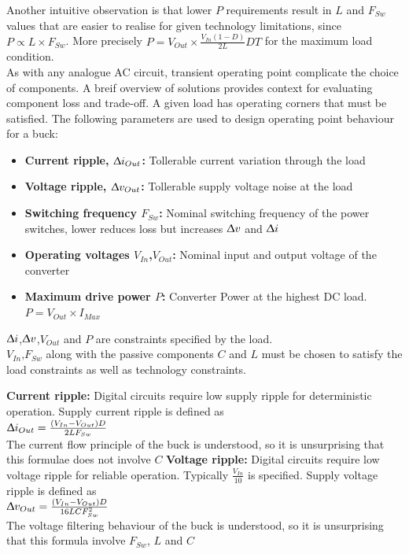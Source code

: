 \documentclass[letterpaper,twocolumn,10pt]{article}
\begin{document}
Another intuitive observation is that lower $P$ requirements result in $L$ and $F_{Sw}$ values that are easier to realise for given technology limitations, since $P \propto L\times F_{Sw}$. More precisely $P = V_{Out}\times \frac{V_{In}(1 - D)}{2L}DT$ for the maximum load condition.\\ %
\indent As with any analogue AC circuit, transient operating point complicate the choice of components. A breif overview of solutions provides context for evaluating component loss and trade-off. %
A given load has operating corners that must be satisfied. The following parameters are used to design operating point behaviour for a buck: %
\begin{itemize}
\item {\textbf{Current ripple, $\Updelta i_{Out}$: }Tollerable current variation through the load}
\item {\textbf{Voltage ripple, $\Updelta v_{Out}$: }Tollerable supply voltage noise at the load}
\item {\textbf{Switching frequency $F_{Sw}$: }Nominal switching frequency of the power switches, lower reduces loss but increases $\Updelta v$ and $\Updelta i$}
\item {\textbf{Operating voltages $V_{In}$,$V_{Out}$: }Nominal input and output voltage of the converter}
\item {\textbf{Maximum drive power $P$: }Converter Power at the highest DC load. $P = V_{Out}\times I_{Max}$} 
\end{itemize}   

$\Updelta i$,$\Updelta v$,$V_{Out}$ and $P$ are constraints specified by the load.\\
$V_{In}$,$F_{Sw}$ along with the passive components $C$ and $L$ must be chosen to satisfy the load constraints as well as technology constraints.

\textbf{Current ripple: }Digital circuits require low supply ripple for deterministic operation. Supply current ripple is defined as\\
$\Updelta i_{Out} = \frac{(V_{In} - V_{Out})D}{2LF_{Sw}}$ ~\cite{Kurson2006}\\
The current flow principle of the buck is understood, so it is unsurprising that this formulae does not involve $C$
\textbf{Voltage ripple: }Digital circuits require low voltage ripple for reliable operation. Typically $\frac{V_{In}}{10}$ is specified. Supply voltage ripple is defined as\\
$\Updelta v_{Out} = \frac{(V_{In} - V_{Out})D}{16LCF_{Sw}^2}$ ~\cite{Kurson2006}\\
The voltage filtering behaviour of the buck is understood, so it is unsurprising that this formula involve $F_{Sw}$, $L$ and $C$\\
\end{document}
